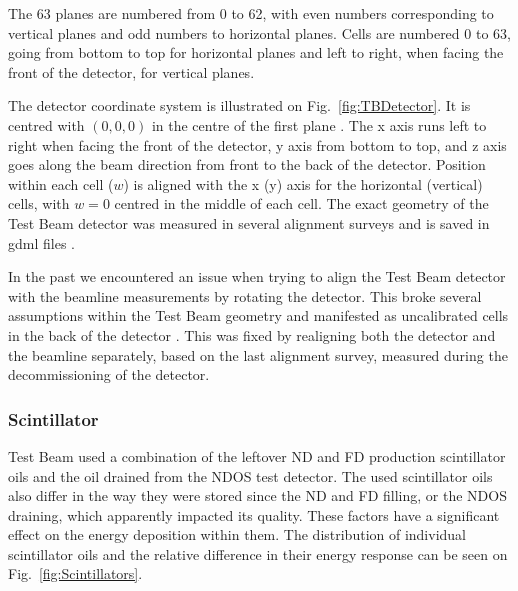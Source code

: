 The 63 planes are numbered from 0 to 62, with even numbers corresponding to vertical planes and odd numbers to horizontal planes. Cells are numbered 0 to 63, going from bottom to top for horizontal planes and left to right, when facing the front of the detector, for vertical planes.

The detector coordinate system is illustrated on Fig.~\ref{fig:TBDetector}. It is centred with $\left(0,0,0\right)$ in the centre of the first plane \cite{NOvA-doc-58388}. The x axis runs left to right when facing the front of the detector, y axis from bottom to top, and z axis goes along the beam direction from front to the back of the detector. Position within each cell ($w$) is aligned with the x (y) axis for the horizontal (vertical) cells, with $w=0$ centred in the middle of each cell. The exact geometry of the Test Beam detector was measured in several alignment surveys and is saved in gdml files \cite{NOvA-doc-57955}.

In the past we encountered an issue when trying to align the Test Beam detector with the beamline measurements by rotating the detector. This broke several assumptions within the Test Beam geometry \cite{NOvA-doc-58388} and manifested as uncalibrated cells in the back of the detector \cite{NOvA-doc-57516}. This was fixed by realigning both the detector and the beamline separately, based on the last alignment survey, measured during the decommissioning of the detector.


\subsubsection*{Scintillator}

Test Beam used a combination of the leftover \gls{ND} and \gls{FD} production scintillator oils and the oil drained from the \gls{NDOS} test detector. The used scintillator oils also differ in the way they were stored since the \gls{ND} and \gls{FD} filling, or the \gls{NDOS} draining, which apparently impacted its quality. These factors have a significant effect on the energy deposition within them. The distribution of individual scintillator oils and the relative difference in their energy response can be seen on Fig.~\ref{fig:Scintillators}.

